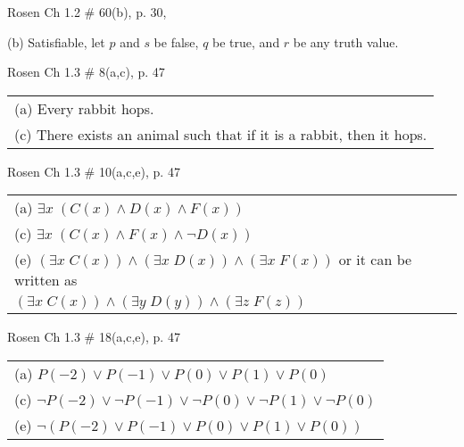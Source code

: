 \documentclass[12pt]{exam}
\begin{document}
\begin{questions}
\question[4] Rosen Ch 1.2 \# 60(b), p. 30,
    \begin{solution}
    (b) Satisfiable, let $p$ and $s$ be false, $q$ be true, and $r$ be
  any truth value.
    \end{solution}

\question[4] Rosen Ch 1.3 \# 8(a,c), p. 47
    \begin{solution}
     \begin{tabular}{l}
        (a) Every rabbit hops. \\
        (c) There exists an animal such that if it is a rabbit, then it hops. \\
    \end{tabular}
    \end{solution}

\question[6] Rosen Ch 1.3 \# 10(a,c,e), p. 47
    \begin{solution}
    \begin{tabular}{l}
    (a) $\exists x\; (C(x) \wedge D(x) \wedge F(x))$ \\
    (c) $\exists x\; (C(x) \wedge F(x) \wedge \neg D(x))$ \\
    (e) $(\exists x\; C(x)) \wedge (\exists x\; D(x)) \wedge (\exists x\; F(x))$ or it can be written as \\
    \hspace{0.5in} $(\exists x\; C(x)) \wedge (\exists y\; D(y)) \wedge (\exists z\; F(z))$ \\
    \end{tabular}
    \end{solution}

\question[6] Rosen Ch 1.3 \# 18(a,c,e), p. 47
    \begin{solution}
    \begin{tabular}{l}
    (a) $P(-2) \vee P(-1) \vee P(0) \vee P(1) \vee P(0)$ \\
    (c) $\neg P(-2) \vee \neg P(-1) \vee \neg P(0) \vee \neg P(1) \vee \neg P(0)$ \\
    (e) $\neg ( P(-2) \vee P(-1) \vee P(0) \vee P(1) \vee P(0) )$ \\
    \end{tabular}
    \end{solution}

\end{questions}
\end{document}
